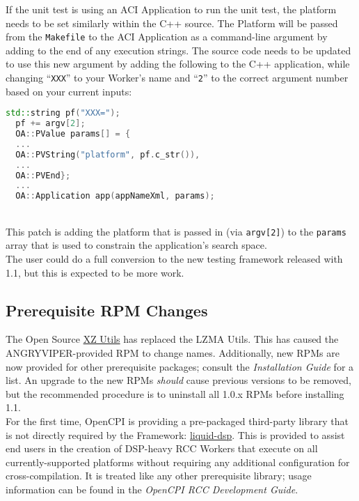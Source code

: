 If the unit test is using an ACI Application to run the unit test, the platform needs to be set similarly within the C++ source. The Platform will be passed from the \texttt{Makefile} to the ACI Application as a command-line argument by adding  to the end of any execution strings. The source code needs to be updated to use this new argument by adding the following to the C++ application, while changing ``\texttt{XXX}'' to your Worker's name and ``\texttt{2}'' to the correct argument number based on your current inputs:\\
\begin{minipage}{\linewidth}
\begin{lstlisting}[language=c++]
  std::string pf("XXX=");
  pf += argv[2];
  OA::PValue params[] = {
  ...
  OA::PVString("platform", pf.c_str()),
  ...
  OA::PVEnd};
  ...
  OA::Application app(appNameXml, params);
\end{lstlisting}
\end{minipage}
~\\
This patch is adding the platform that is passed in (via \texttt{argv[2]}) to the \texttt{params} array that is used to constrain the application's search space.\\

The user could do a full conversion to the new testing framework released with 1.1, but this is expected to be more work.

\subsection{Prerequisite RPM Changes}
\label{sec:11_prereq}
The Open Source \href{http://tukaani.org/xz/}{XZ Utils} has replaced the LZMA Utils. This has caused the ANGRYVIPER-provided RPM to change names. Additionally, new RPMs are now provided for other prerequisite packages; consult the \textit{Installation Guide} for a list. An upgrade to the new RPMs \textit{should} cause previous versions to be removed, but the recommended procedure is to uninstall all 1.0.x RPMs before installing 1.1.\\

For the first time, OpenCPI is providing a pre-packaged third-party library that is not directly required by the Framework: \href{http://liquidsdr.org/}{liquid-dsp}. This is provided to assist end users in the creation of DSP-heavy RCC Workers that execute on all currently-supported platforms without requiring any additional configuration for cross-compilation. It is treated like any other prerequisite library; usage information can be found in the \textit{OpenCPI RCC Development Guide}.

